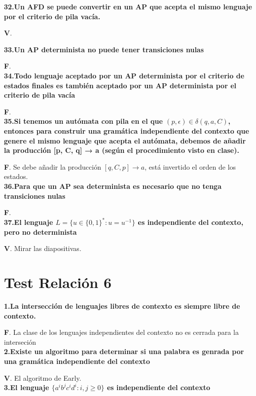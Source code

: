 \documentclass[a4paper,11pt]{article}
\begin{document}
\textbf{32.Un AFD se puede convertir en un AP que acepta el mismo lenguaje por el criterio de pila vacía.}

\textbf{V}. 

\textbf{33.Un AP determinista no puede tener transiciones nulas}

\textbf{F}. \\

\textbf{34.Todo lenguaje aceptado por un AP determinista por el criterio de estados finales es también aceptado por un AP determinista por el criterio de pila vacía}

\textbf{F}. \\

\textbf{35.Si tenemos un autómata con pila en el que $(p,\epsilon)\in \delta(q,a,C)$, entonces para construir una gramática independiente del contexto que genere el mismo lenguaje que acepta el autómata, debemos de añadir la producción [p, C, q] → a (según el procedimiento visto en clase).}

\textbf{F}. Se debe añadir la producción $[q,C,p]\rightarrow a$, está invertido el orden de los estados. \\

\textbf{36.Para que un AP sea determinista es necesario que no tenga transiciones nulas}

\textbf{F}. \\

\textbf{37.El lenguaje $L=\{u \in \{0,1\}^*:u=u^{-1}\}$ es independiente del contexto, pero no determinista}

\textbf{V}. Mirar las diapositivas.

\section{Test Relación 6}

\textbf{1.La intersección de lenguajes libres de contexto es siempre libre de contexto.}

\textbf{F}. La clase de los lenguajes independientes del contexto no es cerrada para la interseción \\

\textbf{2.Existe un algoritmo para determinar si una palabra es genrada por una gramática independiente del contexto}

\textbf{V}. El algoritmo de Early. \\

\textbf{3.El lenguaje $\{a^ib^jc^id^i:i,j\geq 0\}$ es independiente del contexto}
\end{document}
